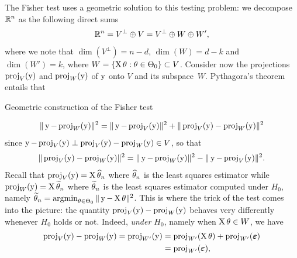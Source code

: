The Fisher test uses a geometric solution to this testing problem: we decompose $\R^n$ as the following direct sums
\begin{equation*}
	\R^n = V^\perp \oplus V = V^\perp \oplus W \oplus W',
\end{equation*}
where we note that $\dim(V^\perp) = n - d$, $\dim(W) = d - k$ and $\dim(W') = k$, where $W = \{ \bX \theta : \theta \in \Theta_0 \} \subset V$.
Consider now the projections $\proj_V(\by)$ and $\proj_W(\by)$ of $\by$ onto $V$ and its subspace~$W$.
Pythagora's theorem entails that%
\begin{marginfigure}%
%
\caption{Geometric construction of the Fisher test}
\end{marginfigure}%
\begin{equation*}
	\norm{\by - \proj_W(\by)}^2 = \norm{\by - \proj_V(\by)}^2 + \norm{\proj_V(\by) - \proj_W(\by)}^2
\end{equation*}
since $\by - \proj_V(\by) \perp \proj_V(\by) - \proj_W(\by) \in V$, so that 
\begin{equation*}
	\norm{\proj_V(\by) - \proj_W(\by)}^2 = \norm{\by - \proj_W(\by)}^2 - \norm{\by - \proj_V(\by)}^2.
\end{equation*}
Recall that $\proj_V(\by) = \bX \wh \theta_n$ where $\wh \theta_n$ is the least squares estimator while $\proj_W(\by) = \bX \wt \theta_n$ where $\wt \theta_n$ is the least squares estimator computed under $H_0$, namely $\wt \theta_n = \argmin_{\theta \in \Theta_0} \norm{\by - \bX \theta}^2$.
This is where the trick of the test comes into the picture: the quantity $\proj_V(\by) - \proj_W(\by)$ behaves very differently whenever $H_0$ holds or not. 
Indeed, \emph{under $H_0$}, namely when $\bX \theta \in W$, we have
\begin{align*}
	\proj_V(\by) - \proj_W(\by) = \proj_{W'} (\by) &= \proj_{W'}(\bX \theta) + \proj_{W'}(\beps) \\
	&= \proj_{W'}(\beps),
\end{align*}
